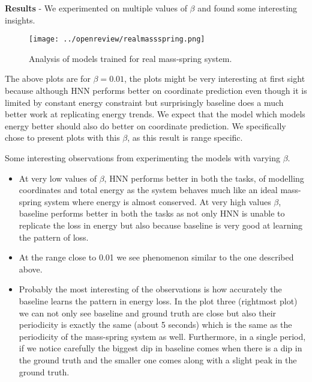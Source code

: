 \textbf{Results} - We experimented on multiple values of \(\beta\) and found some interesting insights.

\begin{figure}[htp]
    \centering
    \texttt{[image: ../openreview/realmassspring.png]}
    \caption{Analysis of models trained for real mass-spring system.}
    \label{fig:galaxy}
\end{figure}

The above plots are for \(\beta = 0.01\), the plots might be very interesting at first sight because although HNN performs better on coordinate prediction even though it is limited by constant energy constraint but surprisingly baseline does a much better work at replicating energy trends. We expect that the model which models energy better should also do better on coordinate prediction. We specifically chose to present plots with this \(\beta\), as this result is range specific.

Some interesting observations from experimenting the models with varying \(\beta\).
\begin{itemize}
  \item At very low values of \(\beta\), HNN performs better in both the tasks, of modelling coordinates and total energy as the system behaves much like an ideal mass-spring system where energy is almost conserved. At very high values \(\beta\), baseline performs  better in both the tasks as not only HNN is unable to replicate the loss in energy but also because baseline is very good at learning the pattern of loss.
  \item At the range close to 0.01 we see phenomenon similar to the one described above.
  \item Probably the most interesting of the observations is how accurately the baseline learns the pattern in energy loss. In the plot three (rightmost plot) we can not only see baseline and ground truth are close but also their periodicity is exactly the same (about 5 seconds) which is the same as the periodicity of the mass-spring system as well. Furthermore, in a single period, if we notice carefully the biggest dip in baseline comes when there is a dip in the ground truth and the smaller one comes along with a slight peak in the ground truth.
\end{itemize}

